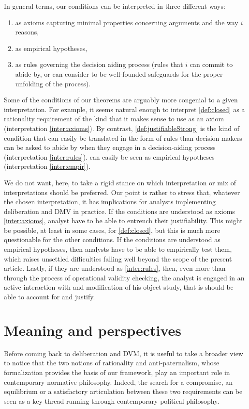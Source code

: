 \documentclass[version=last, pagesize, twoside=off, bibliography=totoc, DIV=calc, fontsize=14pt, a4paper, french, english]{scrartcl}
\begin{document}
In general terms, our conditions can be interpreted in three different ways:
\begin{enumerate}[label=({\roman*})]%
	\item \label{inter:axioms} as axioms capturing minimal properties concerning arguments and the way $i$ reasons,
	\item \label{inter:empir} as empirical hypotheses,
	\item \label{inter:rules} as rules governing the decision aiding process (rules that $i$ can commit to abide by, or can consider to be well-founded safeguards for the proper unfolding of the process).
\end{enumerate}

Some of the conditions of our theorems are arguably more congenial to a given interpretation. For example, it seems natural enough to interpret \cref{def:closed} as a rationality requirement of the kind that it makes sense to use as an axiom (interpretation \ref{inter:axioms}). By contrast, \cref{def:justifiableStrong} is the kind of condition that can easily be translated in the form of rules than decision-makers can be asked to abide by when they engage in a decision-aiding process (interpretation \ref{inter:rules}).  can easily be seen as empirical hypotheses (interpretation \ref{inter:empir}).

We do not want, here, to take a rigid stance on which interpretation or mix of interpretations should be preferred. Our point is rather to stress that, whatever the chosen interpretation, it has implications for analysts implementing deliberation and DMV in practice. If the conditions are understood as axioms \ref{inter:axioms}, analyst have to be able to entrench their justifiability. This might be possible, at least in some cases, for \cref{def:closed}, but this is much more questionable for the other conditions. If the conditions are understood as empirical hypotheses, then analysts have to be able to empirically test them, which raises unsettled difficulties falling well beyond the scope of the present article. Lastly, if they are understood as \ref{inter:rules}, then, even more than through the process of operational validity checking, the analyst is engaged in an active interaction with and modification of his object study, that is should be able to account for and justify.

\section{Meaning and perspectives}
\label{disc}
Before coming back to deliberation and DVM, it is useful to take a broader view to notice that the two notions of rationality and anti-paternalism, whose formalization provides the basis of our framework, play an important role in contemporary normative philosophy. Indeed, the search for a compromise, an equilibrium or a satisfactory articulation between these two requirements can be seen as a key thread running through contemporary political philosophy.
\end{document}
